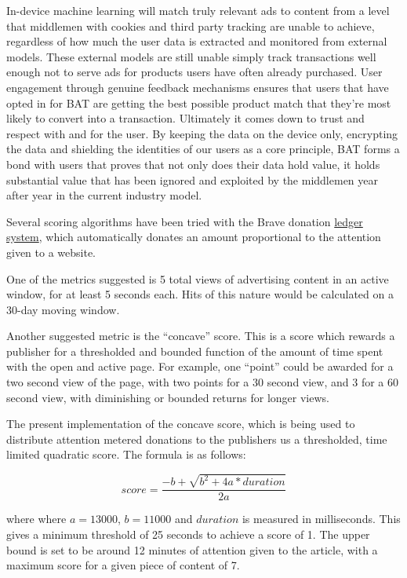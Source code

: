 \documentclass[11pt]{article}
\begin{document}
In-device machine learning will match truly relevant ads to content from a level that middlemen with cookies and third party tracking are unable to achieve, regardless of how much the user data is extracted and monitored from external models. These external models are still unable simply track transactions well enough not to serve ads for products users have often already purchased. User engagement through genuine feedback mechanisms ensures that users that have opted in for BAT are getting the best possible product match that they're most likely to convert into a transaction. Ultimately it comes down to trust and respect with and for the user. By keeping the data on the device only, encrypting the data and shielding the identities of our users as a core principle, BAT forms a bond with users that proves that not only does their data hold value, it holds substantial value that has been ignored and exploited by the middlemen year after year in the current industry model. 

 Several scoring algorithms have been tried with the Brave donation \href{https://github.com/brave/ledger-client}{ledger system}, which automatically donates an amount proportional to the attention given to a website. 

One of the metrics suggested is 5 total views of advertising content in an active window, for at least 5 seconds each. Hits of this nature would be calculated on a 30-day moving window. 

Another suggested metric is the ``concave'' score. This is a score which rewards a publisher for a thresholded and bounded function of the amount of time spent with the open and active page.  For example, one ``point'' could be awarded for a two second view of the page, with two points for a 30 second view, and 3 for a 60 second view, with diminishing or bounded returns for longer views.

The present implementation of the concave score, which is being used to distribute attention metered donations to the publishers us a thresholded, time limited quadratic score. The formula is as follows:

\[ score= \frac{-b + \sqrt{b^2 + 4a*duration}}{2a}\]

where where $a=13000$, $b=11000 $ and $duration$ is measured in
milliseconds. This gives a minimum threshold of 25 seconds to achieve
a score of 1. The upper bound is set to be around 12 minutes of
attention given to the article, with a maximum score for a given piece
of content of 7. 
\end{document}
